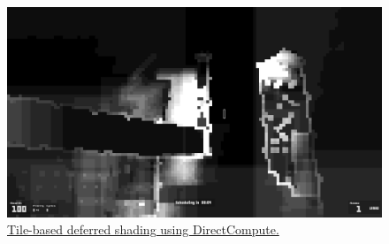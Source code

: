 \begin{frame}
\begin{figure}[ht]
  \begin{minipage}[b]{0.3\linewidth}
    \centering
    \includegraphics[width=1.0\textwidth]{img/tbds3.png}
  \end{minipage}
  \label{fig:tilingvisualization}
  \caption{\href{https://github.com/L0mion/xkill-source}{%
      Tile-based deferred shading using DirectCompute.}}
\end{figure}


\end{frame}
